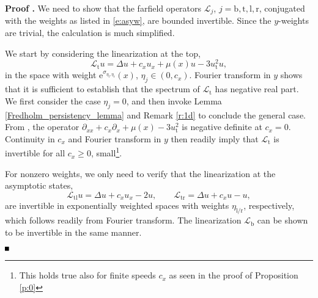 \documentclass[10pt]{article}
\newenvironment{Proof}[1][\unskip]%
 {\begin{trivlist} \item[]{\bf Proof #1. }}%
 {\hspace*{\fill}$\rule{.4\baselineskip}{.4\baselineskip}$\end{trivlist}}
\newcommand{\R}{\mathbb{R}}
\newcommand{\rme}{\mathrm{e}}
\newcommand{\rmi}{\mathrm{i}}
\renewcommand{\geq}{\geqslant}
\begin{document}
\begin{Proof} We need to show that the farfield operators $\mathscr{L}_j$, $j=\mathrm{b,t,l,r}$, conjugated with the weights as listed in \eqref{e:asyw}, are bounded invertible. Since the $y$-weights are trivial, the calculation is much simplified. 

We start by considering the linearization at the top, 
\[
\mathscr{L}_\mathrm{t}u=\Delta u + c_x u_x +\mu(x)u-3u_\mathrm{t}^2u,
\]
in the space with weight $\rme^{\sigma_{\eta_\mathrm{l},\eta_\mathrm{r}}}(x)$, $\eta_j\in(0,c_x)$. Fourier transform in $y$ shows that it is sufficient to establish that the spectrum of $\mathscr{L}_\mathrm{t}$ has negative real part. We first consider the case $\eta_j=0$, and then invoke Lemma \ref{Fredholm_persistency_lemma}  and Remark \ref{r:1d} to conclude the general case. From \cite{Monteiro_Scheel}, the operator $\partial_{xx}+c_x\partial_x + \mu(x) -3u_\mathrm{t}^2$ is negative definite at $c_x=0$. Continuity in $c_x$ and Fourier transform in $y$ then readily imply that $\mathscr{L}_\mathrm{t}$ is invertible for all $c_x\geq 0$, small\footnote{This holds true also for finite speeds $c_x$ as seen in the proof of Proposition \ref{p:0}}.

% 
% 
% 
% 
% 

For nonzero weights, we only need to verify that the linearization at the asymptotic states, 
\[
\mathscr{L}_\mathrm{tl}u=\Delta u + c_x u_x -2u,\qquad \mathscr{L}_\mathrm{tr}=\Delta u + c_x u -u,
\]
are invertible in exponentially weighted spaces with weights $\eta_\mathrm{l/r}$, respectively, which follows readily from Fourier transform. The linearization $\mathscr{L}_\mathrm{b}$ can be shown to be invertible in the same manner.


\end{Proof}
\end{document}
